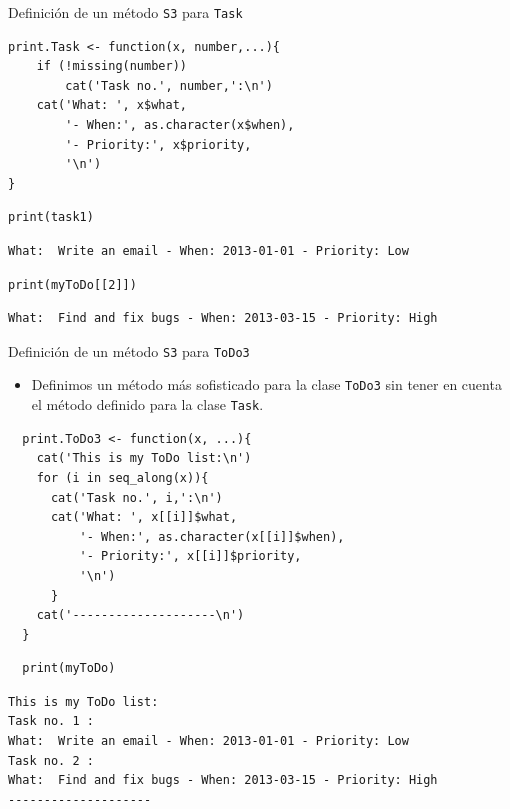 \documentclass[xcolor={usenames,svgnames,dvipsnames}]{beamer}
\begin{document}
\begin{frame}[label={sec:org1928f46},fragile]{Definición de un método \texttt{S3} para \texttt{Task}}
 \lstset{language=r,label= ,caption= ,captionpos=b,numbers=none}
\begin{lstlisting}
print.Task <- function(x, number,...){
    if (!missing(number))
        cat('Task no.', number,':\n')
    cat('What: ', x$what,
        '- When:', as.character(x$when),
        '- Priority:', x$priority,
        '\n')
} 
\end{lstlisting}

\lstset{language=r,label= ,caption= ,captionpos=b,numbers=none}
\begin{lstlisting}
print(task1)
\end{lstlisting}

\begin{verbatim}
What:  Write an email - When: 2013-01-01 - Priority: Low
\end{verbatim}


\lstset{language=r,label= ,caption= ,captionpos=b,numbers=none}
\begin{lstlisting}
print(myToDo[[2]])
\end{lstlisting}

\begin{verbatim}
What:  Find and fix bugs - When: 2013-03-15 - Priority: High
\end{verbatim}
\end{frame}


\begin{frame}[label={sec:org30ac70a},fragile]{Definición de un método \texttt{S3} para \texttt{ToDo3}}
 \begin{itemize}
\item Definimos un método más sofisticado para la clase \texttt{ToDo3} \alert{sin}
tener en cuenta el método definido para la clase \texttt{Task}.
\end{itemize}
\lstset{language=r,label= ,caption= ,captionpos=b,numbers=none}
\begin{lstlisting}
  print.ToDo3 <- function(x, ...){
    cat('This is my ToDo list:\n')
    for (i in seq_along(x)){
      cat('Task no.', i,':\n')
      cat('What: ', x[[i]]$what,
          '- When:', as.character(x[[i]]$when),
          '- Priority:', x[[i]]$priority,
          '\n')
      }
    cat('--------------------\n')
  }
\end{lstlisting}

\lstset{language=r,label= ,caption= ,captionpos=b,numbers=none}
\begin{lstlisting}
  print(myToDo)
\end{lstlisting}

\begin{verbatim}
This is my ToDo list:
Task no. 1 :
What:  Write an email - When: 2013-01-01 - Priority: Low 
Task no. 2 :
What:  Find and fix bugs - When: 2013-03-15 - Priority: High 
--------------------
\end{verbatim}
\end{frame}
\end{document}
